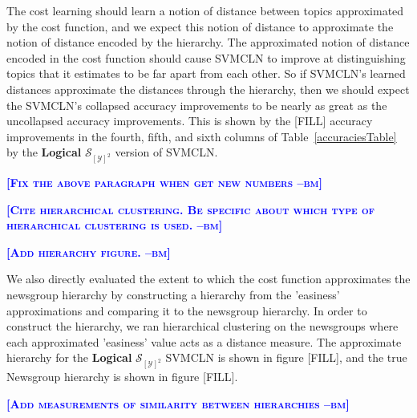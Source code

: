 \documentclass{article} %
\newcommand{\bmcomment}[1]{\textcolor{blue}{\textsc{\textbf{[#1 --bm]}}}}
\begin{document}
The cost learning should learn a notion of distance between topics 
approximated by the cost function, and we expect this notion of distance
to approximate the notion of distance encoded by the hierarchy.  The 
approximated notion of distance encoded in the cost function should 
cause SVMCLN to improve at distinguishing topics that it estimates to
be far apart from each other.  So if SVMCLN's learned distances 
approximate the distances through the hierarchy, then we should expect the SVMCLN's collapsed 
accuracy improvements to be nearly as great as the uncollapsed accuracy
improvements.  This is shown by the [FILL] accuracy improvements in the
fourth, fifth, and sixth columns of Table~\ref{accuraciesTable} by
the \textbf{Logical} $\mathcal{S}_{[\mathcal{Y}]^2}$ version of SVMCLN.

\bmcomment{Fix the above paragraph when get new numbers}

\bmcomment{Cite hierarchical clustering.  Be specific about which
type of hierarchical clustering is used.}

\bmcomment{Add hierarchy figure.}

We also directly evaluated the extent to which the cost function approximates
the newsgroup hierarchy by constructing a hierarchy from the 
'easiness' approximations and comparing it to the newsgroup hierarchy.
In order to construct the hierarchy, we ran hierarchical clustering on
the newsgroups where each approximated 'easiness' value acts as a
distance measure.  The approximate hierarchy for the \textbf{Logical}
$\mathcal{S}_{[\mathcal{Y}]^2}$ SVMCLN is shown in figure [FILL], and the true
Newsgroup hierarchy is shown in figure [FILL].  

\bmcomment{Add measurements of similarity between hierarchies}


%
% 
% 
\end{document}
